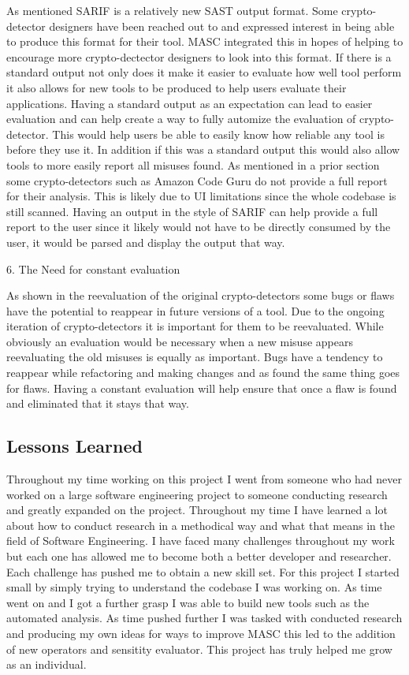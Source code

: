 As mentioned SARIF is a relatively new SAST output format. Some crypto-detector designers have been reached out to and expressed interest in being able to produce this format for their tool. MASC integrated this in hopes of helping to encourage more crypto-dectector designers to look into this format. If there is a standard output not only does it make it easier to evaluate how well tool perform it also allows for new tools to be produced to help users evaluate their applications. Having a standard output as an expectation can lead to easier evaluation and can help create a way to fully automize the evaluation of crypto-detector. This would help users be able to easily know how reliable any tool is before they use it. In addition if this was a standard output this would also allow tools to more easily report all misuses found. As mentioned in a prior section some crypto-detectors such as Amazon Code Guru do not provide a full report for their analysis. This is likely due to UI limitations since the whole codebase is still scanned. Having an output in the style of SARIF can help provide a full report to the user since it likely would not have to be directly consumed by the user, it would be parsed and display the output that way. 

6. The Need for constant evaluation

As shown in the reevaluation of the original crypto-detectors some bugs or flaws have the potential to reappear in future versions of a tool. Due to the ongoing iteration of crypto-detectors it is important for them to be reevaluated. While obviously an evaluation would be necessary when a new misuse appears reevaluating the old misuses is equally as important. Bugs have a tendency to reappear while refactoring and making changes and as found the same thing goes for flaws. Having a constant evaluation will help ensure that once a flaw is found and eliminated that it stays that way.


\subsection{Lessons Learned}
\label{ch6:sec:lessons}

Throughout my time working on this project I went from someone who had never worked on a large software engineering project to someone conducting research and greatly expanded on the project. Throughout my time I have learned a lot about how to conduct research in a methodical way and what that means in the field of Software Engineering. I have faced many challenges throughout my work but each one has allowed me to become both a better developer and researcher. Each challenge has pushed me to obtain a new skill set. For this project I started small by simply trying to understand the codebase I was working on. As time went on and I got a further grasp I was able to build new tools such as the automated analysis. As time pushed further I was tasked with conducted research and producing my own ideas for ways to improve MASC this led to the addition of new operators and sensitity evaluator. This project has truly helped me grow as an individual.

